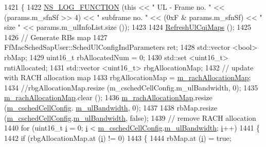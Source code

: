 \begin{DoxyCode}
1421 \{
1422   \hyperlink{log-macros-disabled_8h_a90b90d5bad1f39cb1b64923ea94c0761}{NS\_LOG\_FUNCTION} (\textcolor{keyword}{this} << \textcolor{stringliteral}{" UL - Frame no. "} << (params.m\_sfnSf >> 4) << \textcolor{stringliteral}{" subframe no. "} 
      << (0xF & params.m\_sfnSf) << \textcolor{stringliteral}{" size "} << params.m\_ulInfoList.size ());
1423 
1424   \hyperlink{classns3_1_1TtaFfMacScheduler_ae0cb4fb464a85be701431b9606acdf2e}{RefreshUlCqiMaps} ();
1425 
1426   \textcolor{comment}{// Generate RBs map}
1427   FfMacSchedSapUser::SchedUlConfigIndParameters ret;
1428   std::vector <bool> rbMap;
1429   uint16\_t rbAllocatedNum = 0;
1430   std::set <uint16\_t> rntiAllocated;
1431   std::vector <uint16\_t> rbgAllocationMap;
1432   \textcolor{comment}{// update with RACH allocation map}
1433   rbgAllocationMap = \hyperlink{classns3_1_1TtaFfMacScheduler_a5cef51239a7f724ce375f0ddf883e73c}{m\_rachAllocationMap};
1434   \textcolor{comment}{//rbgAllocationMap.resize (m\_cschedCellConfig.m\_ulBandwidth, 0);}
1435   \hyperlink{classns3_1_1TtaFfMacScheduler_a5cef51239a7f724ce375f0ddf883e73c}{m\_rachAllocationMap}.clear ();
1436   \hyperlink{classns3_1_1TtaFfMacScheduler_a5cef51239a7f724ce375f0ddf883e73c}{m\_rachAllocationMap}.resize (\hyperlink{classns3_1_1TtaFfMacScheduler_af263a06ea69ff1d096ddb48df0ac7f81}{m\_cschedCellConfig}.
      \hyperlink{structns3_1_1FfMacCschedSapProvider_1_1CschedCellConfigReqParameters_a5ab5b102878e6e7e7727a14af4a64d2f}{m\_ulBandwidth}, 0);
1437 
1438   rbMap.resize (\hyperlink{classns3_1_1TtaFfMacScheduler_af263a06ea69ff1d096ddb48df0ac7f81}{m\_cschedCellConfig}.\hyperlink{structns3_1_1FfMacCschedSapProvider_1_1CschedCellConfigReqParameters_a5ab5b102878e6e7e7727a14af4a64d2f}{m\_ulBandwidth}, \textcolor{keyword}{false});
1439   \textcolor{comment}{// remove RACH allocation}
1440   \textcolor{keywordflow}{for} (uint16\_t \hyperlink{bernuolliDistribution_8m_a6f6ccfcf58b31cb6412107d9d5281426}{i} = 0; \hyperlink{bernuolliDistribution_8m_a6f6ccfcf58b31cb6412107d9d5281426}{i} < \hyperlink{classns3_1_1TtaFfMacScheduler_af263a06ea69ff1d096ddb48df0ac7f81}{m\_cschedCellConfig}.\hyperlink{structns3_1_1FfMacCschedSapProvider_1_1CschedCellConfigReqParameters_a5ab5b102878e6e7e7727a14af4a64d2f}{m\_ulBandwidth}; 
      \hyperlink{bernuolliDistribution_8m_a6f6ccfcf58b31cb6412107d9d5281426}{i}++)
1441     \{
1442       \textcolor{keywordflow}{if} (rbgAllocationMap.at (\hyperlink{bernuolliDistribution_8m_a6f6ccfcf58b31cb6412107d9d5281426}{i}) != 0)
1443         \{
1444           rbMap.at (\hyperlink{bernuolliDistribution_8m_a6f6ccfcf58b31cb6412107d9d5281426}{i}) = \textcolor{keyword}{true};

\end{DoxyCode}
